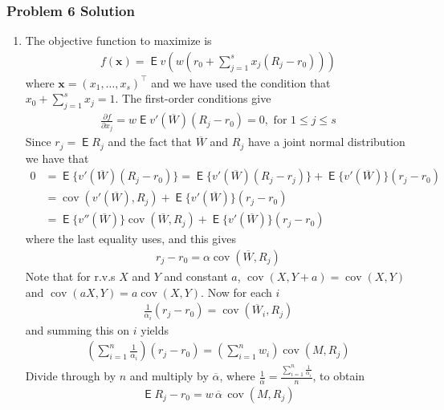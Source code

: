 \documentclass[10pt]{beamer}
\newcommand{\ds}{\displaystyle}
\DeclareMathOperator\expc{\mathsf{E}}
\DeclareMathOperator\cov{cov}
\theoremstyle{definition}
\begin{document}
\begin{frame}[allowframebreaks]
  \frametitle{Problem 6 Solution}
  \begin{enumerate}
    \item The objective function to maximize is
      \begin{align*}
        f(\mathbf{x}) = \expc v\left(w\left(r_0 + \sum_{j=1}^s x_j(R_j - r_0)\right)\right)
      \end{align*}
      where $\mathbf{x} = (x_1,\ldots,x_s)^\top$ and we have used the condition that $x_0 + \sum_{j=1}^s x_j = 1$. The first-order conditions give
      \begin{align*}
        \frac{\partial f}{\partial x_j} = w\expc{v'(\overline{W})(R_j - r_0)} = 0, \text{ for } 1 \leqslant j \leqslant s
      \end{align*}
      Since $r_j = \expc{R_j}$ and the fact that $\overline{W}$ and $R_j$ have a joint normal distribution we have that
      \begin{align*}
        0 &= \expc\big\{v'(\overline{W})(R_j - r_0)\big\} = \expc\big\{v'(\overline{W})(R_j - r_j)\big\} + \expc\big\{v'(\overline{W})\big\}(r_j - r_0) \\
          &= \cov(v'(\overline{W}), R_j) + \expc\big\{v'(\overline{W})\big\}(r_j - r_0) \\
          &= \expc\big\{v''(\overline{W})\big\}\cov(\overline{W}, R_j) + \expc\big\{v'(\overline{W})\big\}(r_j - r_0)
        \end{align*}
      where the last equality uses, and this gives
      \begin{align*}
        r_j - r_0 = \alpha \cov(\overline{W}, R_j)
      \end{align*}
      Note that for r.v.s $X$ and $Y$ and constant $a$, $\cov(X, Y + a) = \cov(X, Y)$ and $\cov(aX, Y) = a\cov(X,Y)$. Now for each $i$
      \begin{align*}
        \frac{1}{\alpha_i}(r_j - r_0) = \cov(\overline{W}_i, R_j)
      \end{align*}
      and summing this on $i$ yields
      \begin{align*}
        \left(\sum_{i=1}^n\frac{1}{\alpha_i}\right)(r_j - r_0) = \left(\sum_{i=1}^n w_i\right)\cov(M, R_j)
      \end{align*}
      Divide through by $n$ and multiply by $\overline{\alpha}$, where $\ds\frac{1}{\overline{\alpha}} = \frac{\sum_{i=1}^n\frac{1}{\alpha_i}}{n}$, to obtain
      \begin{align}\label{eq:m0}
        \expc{R_j} - r_0 = w\,\overline{\alpha}\,\cov(M, R_j)

\end{align}
\end{enumerate}
\end{frame}
\end{document}

